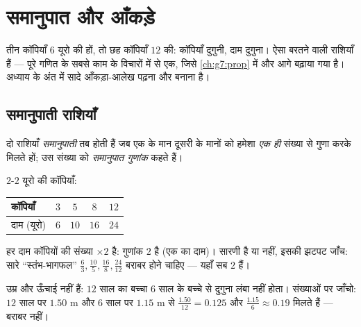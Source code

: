 \chapter{समानुपात और आँकड़े}\label{ch:g6:propdata}

तीन कॉपियाँ $6$ यूरो की हों, तो छह कॉपियाँ $12$ की: कॉपियाँ
दुगुनी, दाम दुगुना। ऐसा बरतने वाली राशियाँ \emph{} हैं
--- पूरे गणित के सबसे काम के विचारों में से एक, जिसे
\cref{ch:g7:prop} में और आगे बढ़ाया गया है। अध्याय के अंत में
सादे आँकड़ा-आलेख पढ़ना और बनाना है।

\section{समानुपाती राशियाँ}

\begin{definition}[समानुपात]\label{def:g6:propdata:def}
दो राशियाँ \emph{समानुपाती} तब होती हैं जब एक के
मान दूसरी के मानों को हमेशा \emph{एक ही} संख्या से गुणा करके
मिलते हों; उस संख्या को \emph{समानुपात गुणांक} कहते
हैं।
\end{definition}

\begin{example}\label{ex:g6:propdata:table}
$2$-$2$ यूरो की कॉपियाँ:
\begin{center}
\renewcommand{\arraystretch}{1.3}
\begin{tabular}{l|cccc}
कॉपियाँ & $3$ & $5$ & $8$ & $12$ \\
\hline
दाम (यूरो) & $6$ & $10$ & $16$ & $24$ \\
\end{tabular}
\end{center}
हर दाम कॉपियों की संख्या $\times 2$ है: गुणांक $2$ है (एक का
दाम)। सारणी  है या नहीं, इसकी झटपट जाँच: सारे
``स्तंभ-भागफल'' $\frac{6}{3}, \frac{10}{5}, \frac{16}{8},
\frac{24}{12}$ बराबर होने चाहिए --- यहाँ सब $2$ हैं।
\end{example}

\begin{example}\label{ex:g6:propdata:nonexample}
उम्र और ऊँचाई  नहीं हैं: $12$ साल का बच्चा $6$ साल के
बच्चे से दुगुना लंबा नहीं होता। संख्याओं पर जाँचो: $12$ साल पर
$1.50$ m और $6$ साल पर $1.15$ m से  $\frac{1.50}{12} = 0.125$
और $\frac{1.15}{6} \approx 0.19$ मिलते हैं --- बराबर नहीं।
\end{example}

